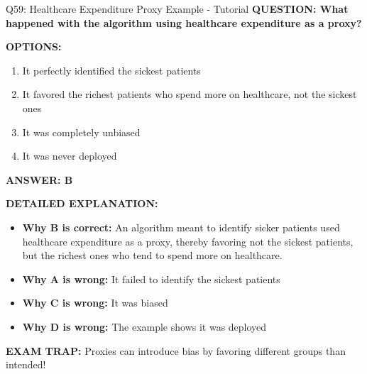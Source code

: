 \documentclass[8pt]{beamer}
\begin{document}
	\begin{frame}{Q59: Healthcare Expenditure Proxy Example - Tutorial}
		\fontsize{6.5}{7.5}\selectfont
		\textbf{QUESTION: What happened with the algorithm using healthcare expenditure as a proxy?}
		
		\vspace{0.1cm}
		\textbf{OPTIONS:}
		\begin{enumerate}
			\item It perfectly identified the sickest patients
			\item It favored the richest patients who spend more on healthcare, not the sickest ones
			\item It was completely unbiased
			\item It was never deployed
		\end{enumerate}
		
		\vspace{0.1cm}
		\textcolor{myblue}{\textbf{ANSWER: B}}
		
		\vspace{0.1cm}
		\textbf{DETAILED EXPLANATION:}
		\begin{itemize}
			\item \textbf{Why B is correct:} An algorithm meant to identify sicker patients used healthcare expenditure as a proxy, thereby favoring not the sickest patients, but the richest ones who tend to spend more on healthcare.
			\item \textbf{Why A is wrong:} It failed to identify the sickest patients
			\item \textbf{Why C is wrong:} It was biased
			\item \textbf{Why D is wrong:} The example shows it was deployed
		\end{itemize}
		
		\textcolor{myred}{\textbf{EXAM TRAP:}} Proxies can \textcolor{myblue}{introduce bias} by favoring different groups than intended!
	\end{frame}
	
\end{document}
